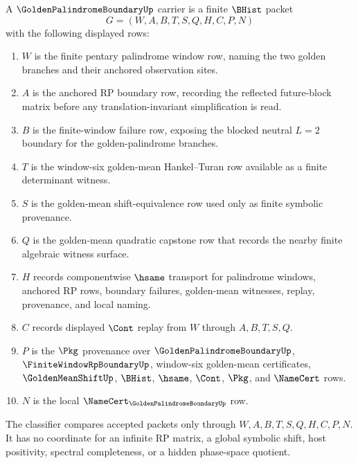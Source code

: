 \begin{definition}
\label{def:golden-palindrome-boundary-carrier}
A $\GoldenPalindromeBoundaryUp$ carrier is a finite $\BHist$ packet
$$
G=(W,A,B,T,S,Q,H,C,P,N)
$$
with the following displayed rows:
\begin{enumerate}
\item $W$ is the finite pentary palindrome window row, naming the two golden branches and their anchored observation sites.
\item $A$ is the anchored RP boundary row, recording the reflected future-block matrix before any translation-invariant simplification is read.
\item $B$ is the finite-window failure row, exposing the blocked neutral $L=2$ boundary for the golden-palindrome branches.
\item $T$ is the window-six golden-mean Hankel--Turan row available as a finite determinant witness.
\item $S$ is the golden-mean shift-equivalence row used only as finite symbolic provenance.
\item $Q$ is the golden-mean quadratic capstone row that records the nearby finite algebraic witness surface.
\item $H$ records componentwise $\hsame$ transport for palindrome windows, anchored RP rows, boundary failures, golden-mean witnesses, replay, provenance, and local naming.
\item $C$ records displayed $\Cont$ replay from $W$ through $A,B,T,S,Q$.
\item $P$ is the $\Pkg$ provenance over $\GoldenPalindromeBoundaryUp$, $\FiniteWindowRpBoundaryUp$, window-six golden-mean certificates, $\GoldenMeanShiftUp$, $\BHist$, $\hsame$, $\Cont$, $\Pkg$, and $\NameCert$ rows.
\item $N$ is the local $\NameCert_{\GoldenPalindromeBoundaryUp}$ row.
\end{enumerate}
The classifier compares accepted packets only through $W,A,B,T,S,Q,H,C,P,N$. It has no coordinate for an infinite RP matrix, a global symbolic shift, host positivity, spectral completeness, or a hidden phase-space quotient.
\end{definition}

